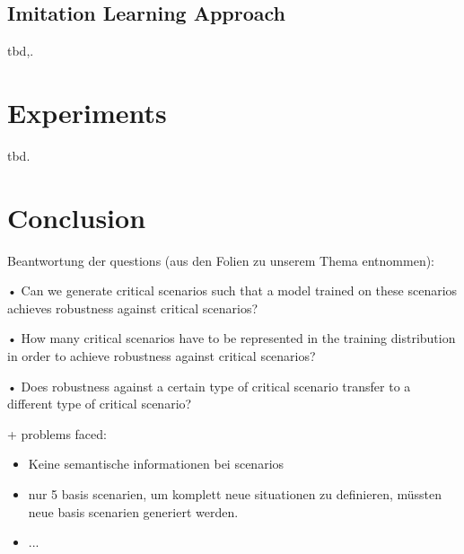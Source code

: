 \documentclass[conference, 11pt]{IEEEtran}
\begin{document}
\subsection{Imitation Learning Approach}
tbd,.

\section{Experiments}
tbd. 



\section{Conclusion}

Beantwortung der questions (aus den Folien zu unserem Thema entnommen):

• Can we generate critical scenarios such that a model trained
on these scenarios achieves robustness against critical
scenarios?

• How many critical scenarios have to be represented in the
training distribution in order to achieve robustness against
critical scenarios?

• Does robustness against a certain type of critical scenario
transfer to a different type of critical scenario?

+ problems faced:
\begin{itemize}
	\item Keine semantische informationen  bei scenarios
	\item nur 5 basis scenarien, um komplett neue situationen zu definieren, müssten neue basis scenarien generiert werden.
	\item ...
\end{itemize}

\printbibliography
\end{document}
